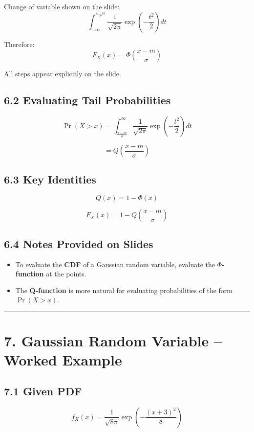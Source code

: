 \documentclass[12pt]{article}
\begin{document}
Change of variable shown on the slide:
\[
\int_{-\infty}^{\frac{x-m}{\sigma}}
\frac{1}{\sqrt{2\pi}}
\exp\!\left(-\frac{t^2}{2}\right) dt
\]

Therefore:
\[
F_X(x) =
\Phi\!\left(\frac{x-m}{\sigma}\right)
\]

All steps appear explicitly on the slide.

\subsection*{6.2 Evaluating Tail Probabilities}

\[
\Pr(X > x) =
\int_{\frac{x-m}{\sigma}}^{\infty}
\frac{1}{\sqrt{2\pi}}
\exp\!\left(-\frac{t^2}{2}\right) dt
\]

\[
= Q\!\left(\frac{x-m}{\sigma}\right)
\]

\subsection*{6.3 Key Identities}

\[
Q(x) = 1 - \Phi(x)
\]

\[
F_X(x) = 1 - Q\!\left(\frac{x-m}{\sigma}\right)
\]

\subsection*{6.4 Notes Provided on Slides}

\begin{itemize}
    \item To evaluate the \textbf{CDF} of a Gaussian random variable, evaluate the \textbf{$\Phi$-function} at the points.
    \item The \textbf{Q-function} is more natural for evaluating probabilities of the form $\Pr(X > x)$.
\end{itemize}

\hrule
\vspace{1em}

\section*{7. Gaussian Random Variable – Worked Example}

\subsection*{7.1 Given PDF}

\[
f_X(x) =
\frac{1}{\sqrt{8\pi}}
\exp\!\left(-\frac{(x+3)^2}{8}\right)
\]
\end{document}
